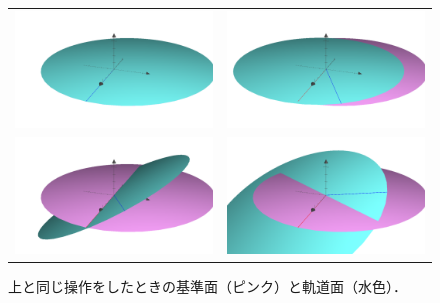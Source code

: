 \documentclass[11pt,a4paper,oneside,onecolumn]{jreport}
\begin{document}
\begin{figure}[H]
\begin{tabular}{cc}
\begin{minipage}[t]{0.45\hsize}
\centering
\includegraphics[width=7cm]{./image/ellipse1.pdf}
\end{minipage} &
\begin{minipage}[t]{0.45\hsize}
\centering
\includegraphics[width=7cm]{./image/ellipse2.pdf}
\end{minipage}\\
%
\begin{minipage}[t]{0.45\hsize}
\centering
\includegraphics[width=7cm]{./image/ellipse3.pdf}
\end{minipage} &
\begin{minipage}[t]{0.45\hsize}
\centering
\includegraphics[width=7cm]{./image/ellipse4.pdf}
\end{minipage}
%
\end{tabular}
\caption{上と同じ操作をしたときの基準面（ピンク）と軌道面（水色）．\label{fig:grapher}}
\end{figure}
\end{document}

